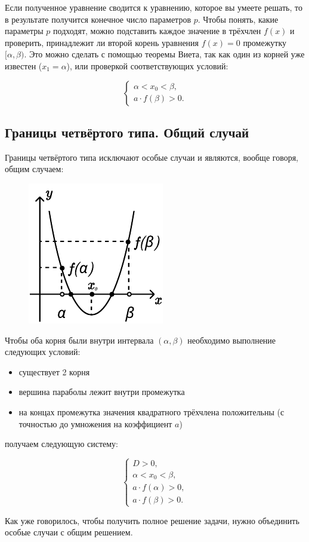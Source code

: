 Если полученное уравнение сводится к уравнению, которое вы умеете решать, то в результате получится
конечное число параметров $p$. Чтобы понять, какие параметры $p$ подходят, можно подставить каждое
значение в трёхчлен $f(x)$ и проверить, принадлежит ли второй корень уравнения $f(x)=0$ промежутку
$[\alpha, \beta)$. Это можно сделать с помощью теоремы Виета, так как один из корней уже известен
($x_1 = \alpha$), или проверкой соответствующих условий:

\begin {equation*}
    \begin {cases}
        \alpha < x_0 < \beta,
        \\
        a \cdot f(\beta) > 0.
    \end {cases}
\end {equation*}

\subsection {Границы четвёртого типа. Общий случай}

Границы четвёртого типа исключают особые случаи и являются, вообще говоря, общим случаем:

\begin {figure} [h]
    \begin {minipage} [b] {\linewidth}
        \centering
        \includegraphics [width=0.3\linewidth] {images/image_02.pdf}
    \end {minipage}
\end {figure}

Чтобы оба корня были внутри интервала $(\alpha, \beta)$ необходимо выполнение следующих условий:

\begin {itemize}
    \item {существует 2 корня}
    \item {вершина параболы лежит внутри промежутка}
    \item {на концах промежутка значения квадратного трёхчлена положительны (с точностью до
    умножения на коэффициент $a$)}
\end {itemize}
получаем следующую систему:

\begin {equation*}
    \begin {cases}
        D > 0,
        \\
        \alpha < x_0 < \beta,
        \\
        a \cdot f(\alpha) > 0,
        \\
        a \cdot f(\beta) > 0.
    \end {cases}
\end {equation*}

Как уже говорилось, чтобы получить полное решение задачи, нужно объединить особые случаи с общим
решением.
